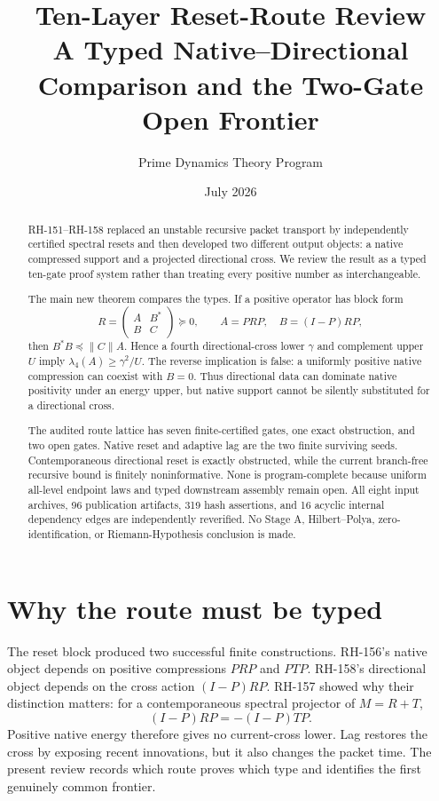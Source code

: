 \documentclass[12pt]{article}
\title{Ten-Layer Reset-Route Review\\\large A Typed Native--Directional Comparison and the Two-Gate Open Frontier}
\author{Prime Dynamics Theory Program}
\date{July 2026}
\begin{document}
\maketitle

\begin{abstract}
RH-151--RH-158 replaced an unstable recursive packet transport by independently
certified spectral resets and then developed two different output objects: a
native compressed support and a projected directional cross.  We review the
result as a typed ten-gate proof system rather than treating every positive
number as interchangeable.

The main new theorem compares the types.  If a positive operator has block
form
\[
 R=\begin{pmatrix}A&B^*\\B&C\end{pmatrix}\succeq0,
 \qquad A=PRP,\quad B=(I-P)RP,
\]
then $B^*B\preceq\|C\|A$.  Hence a fourth directional-cross lower $\gamma$
and complement upper $U$ imply
$\lambda_4(A)\geq\gamma^2/U$.  The reverse implication is false: a uniformly
positive native compression can coexist with $B=0$.  Thus directional data
can dominate native positivity under an energy upper, but native support
cannot be silently substituted for a directional cross.

The audited route lattice has seven finite-certified gates, one exact
obstruction, and two open gates.  Native reset and adaptive lag are the two
finite surviving seeds.  Contemporaneous directional reset is exactly
obstructed, while the current branch-free recursive bound is finitely
noninformative.  None is program-complete because uniform all-level endpoint
laws and typed downstream assembly remain open.  All eight input archives,
96 publication artifacts, 319 hash assertions, and 16 acyclic internal
dependency edges are independently reverified.  No Stage A,
Hilbert--Polya, zero-identification, or Riemann-Hypothesis conclusion is made.
\end{abstract}

\section{Why the route must be typed}
The reset block produced two successful finite constructions.  RH-156's
native object depends on positive compressions $PRP$ and $PTP$.  RH-158's
directional object depends on the cross action $(I-P)RP$.  RH-157 showed why
their distinction matters: for a contemporaneous spectral projector of
$M=R+T$,
\[
 (I-P)RP=-(I-P)TP.
\]
Positive native energy therefore gives no current-cross lower.  Lag restores
the cross by exposing recent innovations, but it also changes the packet time.
The present review records which route proves which type and identifies the
first genuinely common frontier.
\end{document}
